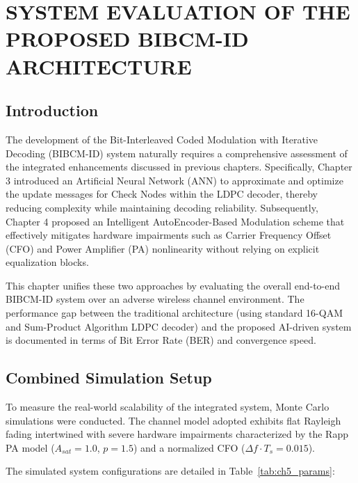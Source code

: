 \documentclass[a4paper,14pt]{extreport}
\begin{document}
\chapter{SYSTEM EVALUATION OF THE PROPOSED BIBCM-ID ARCHITECTURE}

\section{Introduction}

The development of the Bit-Interleaved Coded Modulation with Iterative Decoding (BIBCM-ID) system naturally requires a comprehensive assessment of the integrated enhancements discussed in previous chapters. Specifically, Chapter 3 introduced an Artificial Neural Network (ANN) to approximate and optimize the update messages for Check Nodes within the LDPC decoder, thereby reducing complexity while maintaining decoding reliability. Subsequently, Chapter 4 proposed an Intelligent AutoEncoder-Based Modulation scheme that effectively mitigates hardware impairments such as Carrier Frequency Offset (CFO) and Power Amplifier (PA) nonlinearity without relying on explicit equalization blocks.

This chapter unifies these two approaches by evaluating the overall end-to-end BIBCM-ID system over an adverse wireless channel environment. The performance gap between the traditional architecture (using standard 16-QAM and Sum-Product Algorithm LDPC decoder) and the proposed AI-driven system is documented in terms of Bit Error Rate (BER) and convergence speed.

\section{Combined Simulation Setup}

To measure the real-world scalability of the integrated system, Monte Carlo simulations were conducted. The channel model adopted exhibits flat Rayleigh fading intertwined with severe hardware impairments characterized by the Rapp PA model ($A_{sat}=1.0$, $p=1.5$) and a normalized CFO ($\Delta f \cdot T_s = 0.015$).

The simulated system configurations are detailed in Table~\ref{tab:ch5_params}:
\end{document}
